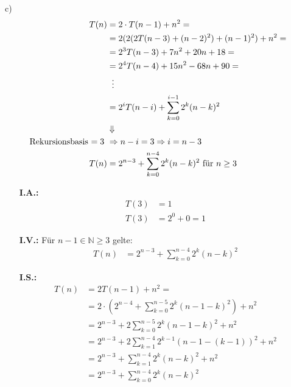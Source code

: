 c) \begin{align*}
	T(n) &= 2 \cdot T(n - 1) + n^2 = \\
    &= 2(2(2T(n - 3) + (n - 2)^2) + (n - 1)^2) + n^2 = \\
    &= 2^3T(n - 3) + 7n^2 + 20n + 18 = \\
    &= 2^4T(n - 4) + 15n^2 - 68n + 90 = \\
    &\hphantom{..} \vdots \\
    &= 2^iT(n - i) + \sum_{k = 0}^{i - 1} 2^k(n - k)^2 \\
    &\Downarrow \\
    \text{Rekursionsbasis $= 3$ } &\Rightarrow n - i = 3 \Rightarrow i = n - 3 \\
    T(n) &= 2^{n - 3} + \sum_{k = 0}^{n - 4} 2^k(n - k)^2 \text{  für $n \geq 3$ }
\end{align*}

\begin{itemize}[nolistsep, noitemsep]
	\item[\textbf{I.A.:}] \begin{align*}
    		T(3) &= 1 \\
            T(3) &= 2^0 + 0 = 1
    	\end{align*}
	\item[\textbf{I.V.:}] Für $n - 1 \in \mathbb{N} \geq 3$ gelte: \begin{align*}
    		T(n) &= 2^{n - 3} + \sum_{k = 0}^{n - 4} 2^k(n - k)^2
    	\end{align*}
	\item[\textbf{I.S.:}] \begin{align*}
    		T(n) &= 2T(n - 1) + n^2 = \\
            &= 2 \cdot \left( 2^{n - 4} + \sum_{k = 0}^{n - 5} 2^k(n - 1 - k)^2 \right) + n^2 \\
            &= 2^{n - 3} + 2\sum_{k = 0}^{n - 5} 2^k(n - 1 - k)^2 + n^2 \\
            &= 2^{n - 3} + 2\sum_{k = 1}^{n - 4} 2^{k - 1}(n - 1 - (k - 1))^2 + n^2 \\
            &= 2^{n - 3} + \sum_{k = 1}^{n - 4} 2^k(n - k)^2 + n^2 \\
            &= 2^{n - 3} + \sum_{k = 0}^{n - 4} 2^k(n - k)^2
    	\end{align*}
\end{itemize}

\nuffsaid